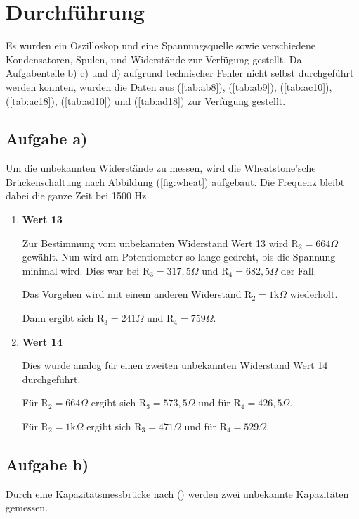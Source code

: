\newpage
\section{Durchführung}
Es wurden ein Oszilloskop und eine Spannungsquelle sowie verschiedene Kondensatoren, Spulen, und Widerstände zur Verfügung gestellt.
Da Aufgabenteile b) c) und d) aufgrund technischer Fehler nicht selbst durchgeführt werden konnten, wurden die Daten aus (\ref{tab:ab8}), (\ref{tab:ab9}), (\ref{tab:ac10}), (\ref{tab:ac18}), (\ref{tab:ad10}) und (\ref{tab:ad18}) zur Verfügung gestellt.

\subsection{Aufgabe a)}
Um die unbekannten Widerstände zu messen, wird die Wheatstone'sche Brückenschaltung nach Abbildung (\ref{fig:wheat}) aufgebaut.
Die Frequenz bleibt dabei die ganze Zeit bei 1500 Hz

\begin{enumerate}
\item \textbf{Wert 13}

Zur Bestimmung vom unbekannten Widerstand Wert 13 wird $\text{R}_2 = 664 \Omega$ gewählt.
Nun wird am Potentiometer so lange gedreht, bis die Spannung minimal wird.
Dies war bei $\text{R}_3 = 317,5 \Omega$ und $\text{R}_4 = 682,5 \Omega$ der Fall.

\noindent
Das Vorgehen wird mit einem anderen Widerstand $\text{R}_2 =1\text{k} \Omega$ wiederholt.

Dann ergibt sich $\text{R}_3 = 241 \Omega$ und $\text{R}_4 = 759 \Omega$.

\item \textbf{Wert 14}

Dies wurde analog für einen zweiten unbekannten Widerstand Wert 14 durchgeführt.

Für $\text{R}_2 = 664 \Omega$ ergibt sich $\text{R}_3 = 573,5 \Omega$ und für $\text{R}_4 = 426,5 \Omega$.

Für $\text{R}_2 = 1\text{k} \Omega$ ergibt sich $\text{R}_3 = 471 \Omega$ und für $\text{R}_4 = 529 \Omega$.
\end{enumerate}


\subsection{Aufgabe b)}

Durch eine Kapazitätsmessbrücke nach () werden zwei unbekannte Kapazitäten gemessen.

